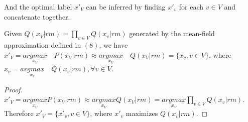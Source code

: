 \documentclass[conference]{IEEEtran}
\begin{document}
And the optimal label $x'_{V}$ can be inferred by finding $x'_{v}$ for each $v\in V$ and concatenate together.
 \begin{mydef1}
 	Given $Q(x_{V}|rm) = \prod\limits_{v\in V} Q(x_{v}|rm)$ generated by the mean-field approximation defined in $(8)$, we have $x'_{V} = \underset{x_{V}} {argmax}  \quad P(x_{V}|rm) \approx \underset{x_{V}} {argmax}  \quad Q(x_{V}|rm)= \{x_{v}, v\in V\}$, where $x_{v} = \underset{x_{v}} {argmax} \quad Q(x_{v}|rm), \forall v\in V$.
 \end{mydef1}	
 \begin{proof}
 	$x'_{V} = \underset{x_{V}} {argmax} P(x_{V}|rm) \approx \underset{x_{V}} {argmax}  Q(x_{V}|rm) = \underset{x_{V}} {argmax}\prod\limits_{v\in V} Q(x_{v}|rm)$. Therefore $x'_{V} = \{x'_{v}, v\in V\}$, where $x'_{v}$ maximizes $Q(x_{v}|rm)$. 
 \end{proof}
 
 
\end{document}
